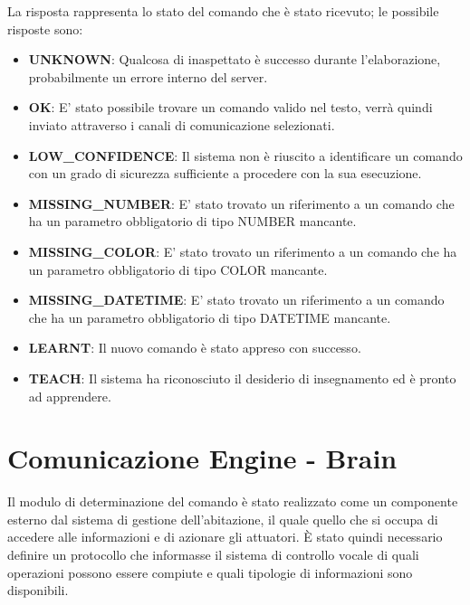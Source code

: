 \documentclass[twoside]{supsistudent}
\begin{document}
La risposta rappresenta lo stato del comando che è stato ricevuto; le possibile risposte sono:
\begin{itemize}
	\item \textbf{UNKNOWN}: Qualcosa di inaspettato è successo durante l'elaborazione, probabilmente un errore interno del server.
	\item \textbf{OK}: E' stato possibile trovare un comando valido nel testo, verrà quindi inviato attraverso i canali di comunicazione selezionati.
	\item \textbf{LOW\_CONFIDENCE}: Il sistema non è riuscito a identificare un comando con un grado di sicurezza sufficiente a procedere con la sua esecuzione.
	\item \textbf{MISSING\_NUMBER}: E' stato trovato un riferimento a un comando che ha un parametro obbligatorio di tipo NUMBER mancante.
	\item \textbf{MISSING\_COLOR}: E' stato trovato un riferimento a un comando che ha un parametro obbligatorio di tipo COLOR mancante.
	\item \textbf{MISSING\_DATETIME}: E' stato trovato un riferimento a un comando che ha un parametro obbligatorio di tipo DATETIME mancante.
	\item \textbf{LEARNT}: Il nuovo comando è stato appreso con successo.
	\item \textbf{TEACH}: Il sistema ha riconosciuto il desiderio di insegnamento ed è pronto ad apprendere.
\end{itemize}

\chapter{Comunicazione Engine - Brain }
Il modulo di determinazione del comando è stato realizzato come un componente esterno dal sistema di gestione dell'abitazione, il quale quello che si occupa di accedere alle informazioni e di azionare gli attuatori. È stato quindi necessario definire un protocollo che informasse il sistema di controllo vocale di quali operazioni possono essere compiute e quali tipologie di informazioni sono disponibili.
\end{document}
